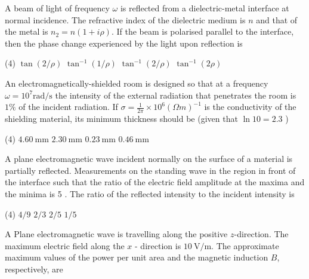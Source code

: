 \begin{enumerate}
\begin{minipage}{\textwidth}
	\item A beam of light of frequency $\omega$ is reflected from a dielectric-metal interface at normal incidence. The refractive index of the dielectric medium is $n$ and that of the metal is $n_{2}=n(1+i \rho)$. If the beam is polarised parallel to the interface, then the phase change experienced by the light upon reflection is
\end{minipage}
\begin{tasks}(4)
	\task[\textbf{A.}] $\tan (2 / \rho)$ 
	\task[\textbf{B.}]$\tan ^{-1}(1 / \rho)$
	\task[\textbf{C.}]$\tan ^{-1}(2 / \rho)$
	\task[\textbf{D.}]$\tan ^{-1}(2 \rho)$
\end{tasks}
\begin{minipage}{\textwidth}
	\item An electromagnetically-shielded room is designed so that at a frequency $\omega=10^{7} \mathrm{rad} / \mathrm{s}$ the intensity of the external radiation that penetrates the room is $1 \%$ of the incident radiation. If $\sigma=\frac{1}{2 \pi} \times 10^{6}(\Omega m)^{-1}$ is the conductivity of the shielding material, its minimum thickness should be (given that $\ln 10=2.3$ )
\end{minipage}
\begin{tasks}(4)
	\task[\textbf{A.}] $4.60 \mathrm{~mm}$
	\task[\textbf{B.}]$2.30 \mathrm{~mm}$
	\task[\textbf{C.}] $0.23 \mathrm{~mm}$
	\task[\textbf{D.}]$0.46 \mathrm{~mm}$
\end{tasks}
\begin{minipage}{\textwidth}
	\item A plane electromagnetic wave incident normally on the surface of a material is partially reflected. Measurements on the standing wave in the region in front of the interface such that the ratio of the electric field amplitude at the maxima and the minima is 5 . The ratio of the reflected intensity to the incident intensity is
\end{minipage}
\begin{tasks}(4)
	\task[\textbf{A.}] $4 / 9$
	\task[\textbf{B.}] $2 / 3$
	\task[\textbf{C.}]$2 / 5$
	\task[\textbf{D.}]$1 / 5$
\end{tasks}
\begin{minipage}{\textwidth}
	\item A Plane electromagnetic wave is travelling along the positive $z$-direction. The maximum electric field along the $x$ - direction is $10 \mathrm{~V} / \mathrm{m}$. The approximate maximum values of the power per unit area and the magnetic induction $B$, respectively, are

\end{minipage}
\end{enumerate}
